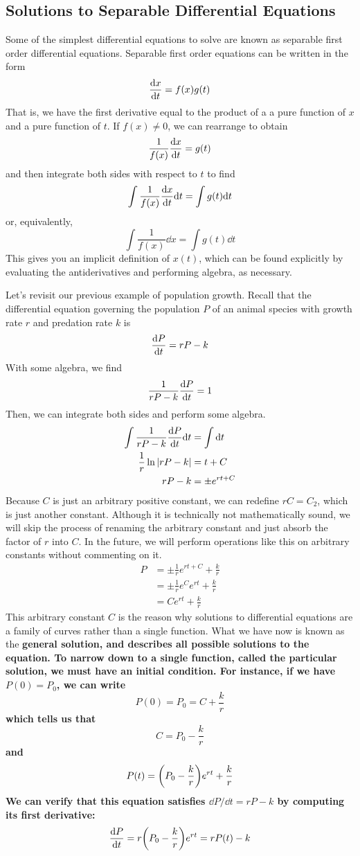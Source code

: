 \subsection{Solutions to Separable Differential Equations} \label{separablesection}
Some of the simplest differential equations to solve are known as separable first order differential equations. Separable first order equations can be written in the form
\[ \dv{x}{t} = f(x)g(t) \]
That is, we have the first derivative equal to the product of a a pure function of $x$ and a pure function of $t$. If $f(x) \neq 0$, we can rearrange to obtain
\[ \frac{1}{f(x)}\dv{x}{t} = g(t) \]
and then integrate both sides with respect to $t$ to find
\[ \int \frac{1}{f(x)}\dv{x}{t}\dd t = \int g(t) \dd t \]
or, equivalently,
\[ \int \frac{1}{f(x)}\dd x = \int g(t)\dd t \]
This gives you an implicit definition of $x(t)$, which can be found explicitly by evaluating the antiderivatives and performing algebra, as necessary. 
\begin{example}
    Let's revisit our previous example of population growth. Recall that the differential equation governing the population $P$ of an animal species with growth rate $r$ and predation rate $k$ is 
    \[ \dv{P}{t} = rP - k \]
    With some algebra, we find 
    \[ \frac{1}{rP - k}\dv{P}{t} = 1 \]
    Then, we can integrate both sides and perform some algebra.
    \begin{align*}
        \int \frac{1}{rP - k}\dv{P}{t}\dd t &= \int \dd t \\
        \frac{1}{r}\ln \abs{rP - k} &= t + C \\
        rP - k &= \pm e^{rt + C}
    \end{align*}
    Because $C$ is just an arbitrary positive constant, we can redefine $rC = C_2$, which is just another constant. Although it is technically not mathematically sound, we will skip the process of renaming the arbitrary constant and just absorb the factor of $r$ into $C$. In the future, we will perform operations like this on arbitrary constants without commenting on it.
    \begin{align*}
        P &=  \pm\frac{1}{r}e^{rt + C} + \frac{k}{r} \\
        &= \pm \frac{1}{r}e^C e^{rt} + \frac{k}{r} \\
        &= Ce^{rt} + \frac{k}{r}
    \end{align*}
    This arbitrary constant $C$ is the reason why solutions to differential equations are a family of curves rather than a single function. What we have now is known as the \bf{general solution}, and describes all possible solutions to the equation. To narrow down to a single function, called the \bf{particular solution}, we must have an \bf{initial condition}. For instance, if we have $P(0) = P_0$, we can write
    \[ P(0) = P_0 = C + \frac{k}{r} \]
    which tells us that
    \[ C = P_0 - \frac{k}{r} \]
    and
    \[ P(t) = \pqty{P_0-\frac{k}{r}}e^{rt} + \frac{k}{r} \]
    We can verify that this equation satisfies $\dd P/\dd t = rP - k$ by computing its first derivative:
    \[ \dv{P}{t} = r\pqty{P_0 - \frac{k}{r}}e^{rt} = rP(t) - k \]
\end{example}
